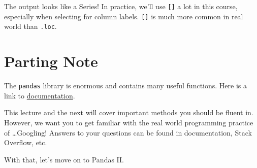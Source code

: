 \documentclass[
  letterpaper,
  DIV=11,
  numbers=noendperiod]{scrreprt}
\begin{document}
The output looks like a Series! In practice, we'll use \texttt{{[}{]}} a
lot in this course, especially when selecting for column labels.
\texttt{{[}{]}} is much more common in real world than \texttt{.loc}.

\hypertarget{parting-note}{%
\section{Parting Note}\label{parting-note}}

The \texttt{pandas} library is enormous and contains many useful
functions. Here is a link to
\href{https://pandas.pydata.org/docs/}{documentation}.

This lecture and the next will cover important methods you should be
fluent in. However, we want you to get familiar with the real world
programming practice of \ldots Googling! Answers to your questions can
be found in documentation, Stack Overflow, etc.

With that, let's move on to Pandas II.
\end{document}
